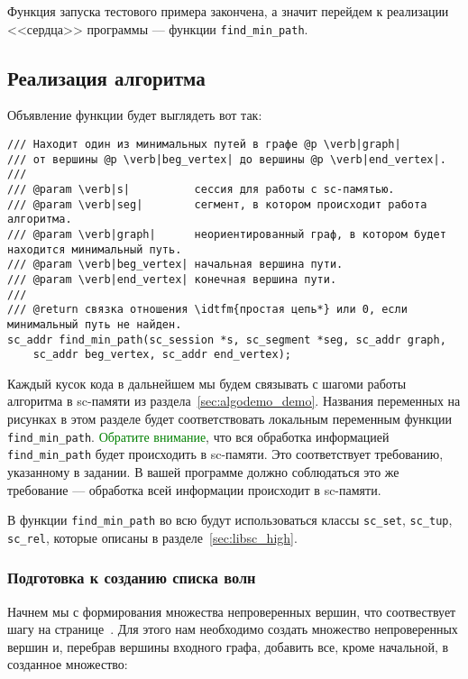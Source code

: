 Функция запуска тестового примера закончена, а значит перейдем к
реализации <<сердца>> программы --- функции \lstinline|find_min_path|.

\subsection{Реализация алгоритма}
\label{sec:libscprg_find_min_path}

Объявление функции будет выглядеть вот так:

\begin{lstlisting}[texcl]
/// Находит один из минимальных путей в графе @p \verb|graph|
/// от вершины @p \verb|beg_vertex| до вершины @p \verb|end_vertex|.
///
/// @param \verb|s|          сессия для работы с sc-памятью.
/// @param \verb|seg|        сегмент, в котором происходит работа алгоритма.
/// @param \verb|graph|      неориентированный граф, в котором будет находится минимальный путь.
/// @param \verb|beg_vertex| начальная вершина пути.
/// @param \verb|end_vertex| конечная вершина пути.
///
/// @return связка отношения \idtfm{простая цепь*} или 0, если минимальный путь не найден.
sc_addr find_min_path(sc_session *s, sc_segment *seg, sc_addr graph,
    sc_addr beg_vertex, sc_addr end_vertex);
\end{lstlisting}

Каждый кусок кода в дальнейшем мы будем связывать с шагоми работы
алгоритма в sc-памяти из раздела~\ref{sec:algodemo_demo}. Названия
переменных на рисунках в этом разделе будет соответствовать локальным
переменным функции
\lstinline|find_min_path|. \textcolor{green}{Обратите внимание}, что
вся обработка информацией \lstinline|find_min_path| будет происходить
в sc-памяти. Это соответствует требованию, указанному в задании. В
вашей программе должно соблюдаться это же требование --- обработка
всей информации происходит в sc-памяти.

В функции \lstinline|find_min_path| во всю будут использоваться классы
\lstinline|sc_set|, \lstinline|sc_tup|, \lstinline|sc_rel|, которые
описаны в разделе~\ref{sec:libsc_high}.

\subsubsection{Подготовка к созданию списка волн}
\label{sec:libscprg_fmp_before_waves_list}

Начнем мы с формирования множества непроверенных вершин, что
соотвествует шагу на
странице~\pageref{astep:S2_Create_unchecked_vertexes_set}. Для этого
нам необходимо создать множество непроверенных вершин и, перебрав
вершины входного графа, добавить все, кроме начальной, в созданное
множество:

